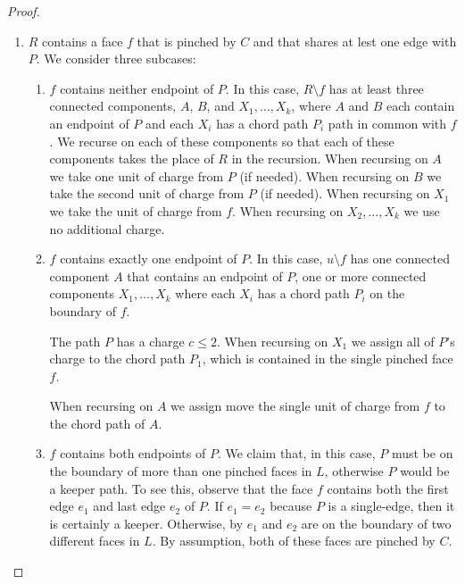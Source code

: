 \documentclass{patmorin}
\begin{document}
\begin{proof}
\begin{enumerate}
     \item $R$ contains a face $f$ that is pinched by $C$ and that shares
     at lest one edge with $P$.  We consider three subcases:
     \begin{enumerate}
        \item $f$ contains neither endpoint of $P$. In this case,
        $R\setminus f$ has at least three connected components, $A$,
        $B$, and $X_1,\ldots,X_k$, where $A$ and $B$ each contain an
        endpoint of $P$ and each $X_i$ has a chord path $P_i$ path in
        common with $f$.  We recurse on each of these components so
        that each of these components takes the place of $R$ in the
        recursion. When recursing on $A$ we take one unit of charge
        from $P$ (if needed).  When recursing on $B$ we take the second
        unit of charge from $P$ (if needed).  When recursing on $X_1$ we
        take the unit of charge from $f$. When recursing on $X_2,\ldots,X_k$
        we use no additional charge.

	\item $f$ contains exactly one endpoint of $P$.  In this case,
	$u\setminus f$ has one connected component $A$ that contains an
	endpoint of $P$, one or more connected components $X_1,\ldots,X_k$
	where each $X_i$ has a chord path $P_i$ on the boundary of $f$.

	The path $P$ has a charge $c\le 2$.  When recursing on $X_1$ we
	assign all of $P$'s charge to the chord path $P_1$, which is contained
        in the single pinched face $f$.
		     
	When recursing on $A$ we assign move the single unit of charge
	from $f$ to the chord path of $A$.

        \item $f$ contains both endpoints of $P$.  We claim that,
        in this case, $P$ must be on the boundary of more than one
        pinched faces in $L$, otherwise $P$ would be a keeper path.
        To see this, observe that the face $f$ contains both the first
        edge $e_1$ and last edge $e_2$ of $P$. If $e_1=e_2$ because $P$
        is a single-edge, then it is certainly a keeper. Otherwise, by
         $e_1$ and $e_2$ are on the boundary of
        two different faces in $L$.  By assumption, both of these faces
        are pinched by $C$.


\end{enumerate}
\end{enumerate}
\end{proof}
\end{document}
